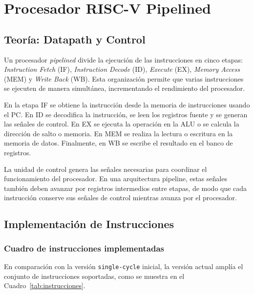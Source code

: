 \chapter{Procesador RISC-V Pipelined}

\section{Teoría: Datapath y Control}

Un procesador \textit{pipelined} divide la ejecución de las instrucciones en cinco etapas: \textit{Instruction Fetch} (IF), \textit{Instruction Decode} (ID), \textit{Execute} (EX), \textit{Memory Access} (MEM) y \textit{Write Back} (WB). Esta organización permite que varias instrucciones se ejecuten de manera simultánea, incrementando el rendimiento del procesador.

En la etapa IF se obtiene la instrucción desde la memoria de instrucciones usando el PC. En ID se decodifica la instrucción, se leen los registros fuente y se generan las señales de control. En EX se ejecuta la operación en la ALU o se calcula la dirección de salto o memoria. En MEM se realiza la lectura o escritura en la memoria de datos. Finalmente, en WB se escribe el resultado en el banco de registros.

La unidad de control genera las señales necesarias para coordinar el funcionamiento del procesador. En una arquitectura pipeline, estas señales también deben avanzar por registros intermedios entre etapas, de modo que cada instrucción conserve sus señales de control mientras avanza por el procesador.

\section{Implementación de Instrucciones}

\subsection{Cuadro de instrucciones implementadas}

En comparación con la versión \texttt{single-cycle} inicial, la versión actual amplía el conjunto de instrucciones soportadas, como se muestra en el Cuadro~\ref{tab:instrucciones}.

